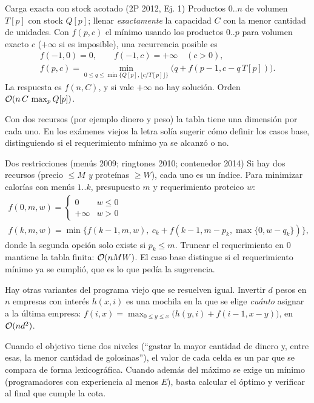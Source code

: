 \begin{problema}{Carga exacta con stock acotado (2P 2012, Ej. 1)}
Productos $0..n$ de volumen $T[p]$ con stock $Q[p]$; llenar \emph{exactamente}
la capacidad $C$ con la menor cantidad de unidades. Con $f(p,c)$ el mínimo
usando los productos $0..p$ para volumen exacto $c$ ($+\infty$ si es
imposible), una recurrencia posible es
\begin{gather*}
f(-1,0)=0,\qquad f(-1,c)=+\infty\quad (c>0),\\
f(p,c)=\min_{0\le q\le\min\{Q[p],\lfloor c/T[p]\rfloor\}}\bigl(q+f(p-1,c-q\,T[p])\bigr).
\end{gather*}
La respuesta es $f(n,C)$, y si vale $+\infty$ no hay solución. Orden
$\mathcal{O}(n\,C\,\max_pQ[p])$.
\end{problema}

Con dos recursos (por ejemplo dinero y peso) la tabla tiene una dimensión
por cada uno. En los exámenes viejos la letra solía sugerir cómo definir los
casos base, distinguiendo si el requerimiento mínimo ya se alcanzó o no.

\begin{problema}{Dos restricciones (menús 2009; ringtones 2010; contenedor 2014)}
Si hay dos recursos (precio $\le M$ \emph{y} proteínas $\ge W$), cada uno es
un índice. Para minimizar calorías con menús $1..k$, presupuesto $m$ y
requerimiento proteico $w$:
\begin{gather*}
f(0,m,w)=\begin{cases}0 & w\le 0\\ +\infty & w>0\end{cases}\\
f(k,m,w)=\min\bigl\{f(k-1,m,w),\ c_k+f(k-1,m-p_k,\max\{0,w-q_k\})\bigr\},
\end{gather*}
donde la segunda opción solo existe si $p_k\le m$. Truncar el requerimiento
en 0 mantiene la tabla finita: $\mathcal{O}(nMW)$. El caso base distingue si el
requerimiento mínimo ya se cumplió, que es lo que pedía la sugerencia.
\end{problema}

Hay otras variantes del programa viejo que se resuelven igual. Invertir
$d$ pesos en $n$ empresas con interés $h(x,i)$ es una mochila en la que se
elige \emph{cuánto} asignar a la última empresa:
$f(i,x)=\max_{0\le y\le x}\bigl(h(y,i)+f(i-1,x-y)\bigr)$, en
$\mathcal{O}(nd^2)$.

Cuando el objetivo tiene dos niveles (``gastar la mayor cantidad de dinero
y, entre esas, la menor cantidad de golosinas''), el valor de cada celda es
un par que se compara de forma lexicográfica. Cuando además del máximo se
exige un mínimo (programadores con experiencia al menos $E$), basta
calcular el óptimo y verificar al final que cumple la cota.

